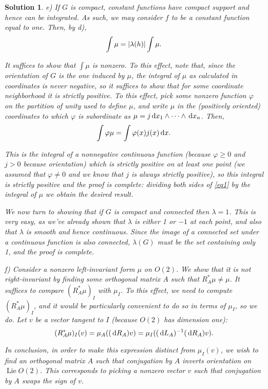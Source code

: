 \documentclass{article}
\theoremstyle{nonumberplain}
\newtheorem{sol}{Solution}
\DeclareMathOperator{\Lie}{Lie}
\DeclarePairedDelimiter{\abs}{\lvert}{\rvert}
\begin{document}
\begin{sol}
\medskip

e) If $G$ is compact, constant functions have compact support and hence can be integrated. As such, we may consider $f$ to be a constant function equal to one. Then, by d),
\begin{equation}\label{eq1}
\int \mu = \abs{\lambda(h)} \int \mu.
\end{equation}

It suffices to show that $\int \mu$ is nonzero. To this effect, note that, since the orientation of $G$ is the one induced by $\mu$, the integral of $\mu$ as calculated in coordinates is never negative, so it suffices to show that for some coordinate neighborhood it is strictly positive. To this effect, pick some nonzero function $\varphi$ on the partition of unity used to define $\mu$, and write $\mu$ in the (positively oriented) coordinates to which $\varphi$ is subordinate as $\mu = j \dl x_1 \wedge \dots \wedge \dl x_n$. Then,
\[\int \varphi \mu = \int \varphi(x) j(x) \dl x.\]

This is the integral of a nonnegative continuous function (because $\varphi \geq 0$ and $j > 0$ because orientation) which is strictly positive on at least one point (we assumed that $\varphi \neq 0$ and we know that $j$ is always strictly positive), so this integral is strictly positive and the proof is complete: dividing both sides of \eqref{eq1} by the integral of $\mu$ we obtain the desired result.

We now turn to showing that if $G$ is compact and connected then $\lambda = 1$. This is very easy, as we've already shown that $\lambda$ is either 1 or $-1$ at each point, and also that $\lambda$ is smooth and hence continuous. Since the image of a connected set under a continuous function is also connected, $\lambda(G)$ must be the set containing only 1, and the proof is complete.

\medskip

f) Consider a nonzero left-invariant form $\mu$ on $O(2)$. We show that it is not right-invariant by finding some orthogonal matrix $A$ such that $R^*_A \mu \neq \mu$. It suffices to compare $(R^*_A \mu)_I$ with $\mu_I$. To this effect, we need to compute $(R^*_A \mu)_I$, and it would be particularly convenient to do so in terms of $\mu_I$, so we do. Let $v$ be a vector tangent to $I$ (because $O(2)$ has dimension one):
\[(R^*_A \mu)_I(v) = \mu_A ((\dl R_A) v) = \mu_I ((\dl L_A)^{-1} (\dl R_A) v).\]

In conclusion, in order to make this expression distinct from $\mu_I(v)$, we wish to find an orthogonal matrix $A$ such that conjugation by $A$ inverts orientation on $\Lie O(2)$. This corresponds to picking a nonzero vector $v$ such that conjugation by $A$ swaps the sign of $v$.


\end{sol}
\end{document}
